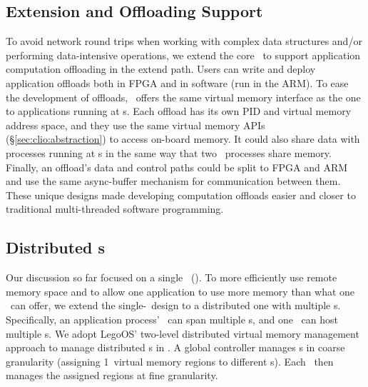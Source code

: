 \subsection{Extension and Offloading Support}
\label{sec:clio:extended}
To avoid network round trips when working with complex data structures and/or performing data-intensive operations,
we extend the core \MN\ to support application computation offloading in the extend path.
Users can write and deploy application offloads both in FPGA and in software (run in the ARM).
To ease the development of offloads, \sys\ offers the same virtual memory interface as the one to applications running at \CN{}s.
Each offload has its own PID and virtual memory address space, and they use the same virtual memory APIs (\S\ref{sec:clio:abstraction}) to access on-board memory. It could also share data with processes running at \CN{}s in the same way that two \CN\ processes share memory.
Finally, an offload’s data and control paths could be split to FPGA and ARM and use the same async-buffer mechanism for communication between them. 
These unique designs made developing computation offloads easier and closer to traditional multi-threaded software programming.


\subsection{Distributed \MN{}s}
\label{sec:clio:dist}
Our discussion so far focused on a single \MN\ (\sysboard).
To more efficiently use remote memory space and to allow one application to use more memory than what one \sysboard\ can offer, we extend the single-\MN\ design to a distributed one with multiple \MN{}s.
Specifically, an application process' \rspace\ can span multiple \MN{}s, and one \MN\ can host multiple \rspace{}s.
We adopt LegoOS' two-level distributed virtual memory management approach to manage distributed \MN{}s in \sys.
A global controller manages \rspace{}s in coarse granularity (assigning 1\GB\ virtual memory regions to different \MN{}s).
Each \MN\ then manages the assigned regions at fine granularity.

